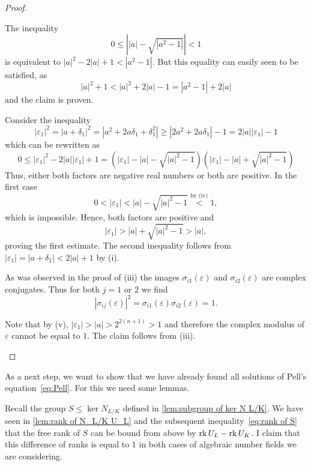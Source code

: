\begin{proof}
\begin{plist}
    \item The inequality
    \[
      0 ≤ \left\vert |a| - \sqrt{|a^2 - 1|} \right\vert < 1
    \]
    is equivalent to \(|a|^2 - 2 |a| + 1 < |a^2 - 1|\). But this equality can easily seen to be satisfied, as
    \[
      |a|^2 + 1 < |a|^2 + 2|a| - 1 = |a^2 - 1| + 2 |a|
    \]
    and the claim is proven.

    \item Consider the inequality
    \[
      |ε_1|^2 = |a + δ_1|^2 = |a^2 + 2 a δ_1 + δ_1^2| ≥ |2a^2 + 2a δ_1| - 1 = 2 |a| |ε_1| - 1
    \]
    which can be rewritten as
    \[
      0 ≤ |ε_1|^2 - 2 |a| |ε_1| + 1 = \left(|ε_1| - |a| - \sqrt{|a|^2 - 1}\right) \left(|ε_1| - |a| + \sqrt{|a|^2 - 1}\right)
    \]
    Thus, either both factors are negative real numbers or both are positive. In the first case
    \[
      0 < |ε_1| < |a| - \sqrt{|a|^2 - 1} \overset{\text{by (iv)}}{<} 1,
    \]
    which is impossible. Hence, both factors are positive and
    \[
      |ε_1| > |a| + \sqrt{|a|^2 - 1}  > |a|,
    \]
    proving the first estimate. The second inequality follows from \(|ε_1| = |a + δ_1| < 2|a| + 1\) by (i).

    \item As was observed in the proof of (iii) the images \(σ_{i1}(ε)\) and
    \(σ_{i2}(ε)\) are complex conjugates. Thus for both \(j = 1\) or \(2\) we
    find
    \[
      |σ_{ij}(ε)|^2 = σ_{i1}(ε) σ_{i2}(ε) = 1.
    \]

    \item Note that by (v), \(|ε_1| > |a| > 2^{2(n + 1)} > 1\) and therefore the
    complex modulus of \(ε\) cannot be equal to \(1\). The claim follows from
    (iii).
  \end{plist}
\end{proof}

As a next step, we want to show that we have already found all solutions of
Pell's equation~\eqref{eq:Pell}. For this we need some lemmas.

Recall the group \(S ≤ \ker N_{L / K}\) defined in \cref{lem:subgroup of ker N
L/K}. We have seen in \cref{lem:rank of N_L/K U_L} and the subsequent
inequality~\eqref{eq:rank of S} that the free rank of \(S\) can be bound from
above by \(\operatorname{rk} U_L - \operatorname{rk} U_K\). I claim that this difference of ranks is equal
to \(1\) in both cases of algebraic number fields we are considering.

